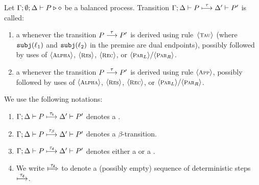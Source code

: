 \begin{definition}
\label{def:dettrans}
	Let  $\Gamma; \emptyset; \Delta \vdash P \triangleright \diamond$ be a balanced \HOp process. 
	Transition $\Gamma; \Delta \vdash P \stackrel{\tau}{\longmapsto} \Delta' \vdash P'$ is called:
%
	\begin{enumerate}[$-$]
		\item 
				a {\em \sesstran} whenever the   transition $P \stackrel{\tau}{\longrightarrow} P'$ 
				is derived using rule~${\langle \text{\footnotesize \textsc{Tau}} \rangle}$ 
				(where $\mathtt{subj}(\ell_1)$ and $\mathtt{subj}(\ell_2)$ in the premise are dual endpoints), 
				possibly followed by uses of  ${\langle \text{\footnotesize \textsc{Alpha}} \rangle}$, ${\langle \text{\footnotesize \textsc{Res}} \rangle}$, ${\langle \text{\footnotesize \textsc{Rec}} \rangle}$, or ${\langle \text{\footnotesize \textsc{Par${}_L$}} \rangle}/
				{\langle \text{\footnotesize \textsc{Par${}_R$}} \rangle}$.

		
		\item
				a {\em \betatran} whenever the transition $P \stackrel{\tau}{\longrightarrow} P'$
				is derived using rule ${\langle \text{\footnotesize \textsc{App}} \rangle}$,
				possibly followed by uses of  ${\langle \text{\footnotesize \textsc{Alpha}} \rangle}$, ${\langle \text{\footnotesize \textsc{Res}} \rangle}$, ${\langle \text{\footnotesize \textsc{Rec}} \rangle}$, or ${\langle \text{\footnotesize \textsc{Par${}_L$}} \rangle}/
				{\langle \text{\footnotesize \textsc{Par${}_R$}} \rangle}$.


	\end{enumerate}
%
\end{definition}

\begin{notation} We use the following notations:
	\begin{enumerate}[$-$]
		\item 	 $\Gamma; \Delta \vdash P \stackrel{\tau_{\mathsf{s}}}{\longmapsto} \Delta' \vdash P'$  denotes a \sesstran.
		
		\item  $\Gamma; \Delta \vdash P \stackrel{\tau_{\beta}}{\longmapsto} \Delta' \vdash P'$   denotes a $\beta$-transition.

		\item	 $\Gamma; \Delta \vdash P \stackrel{\tau_{\mathsf{d}}}{\longmapsto} \Delta' \vdash P'$   denotes
				either a \sesstran or a \betatran.
\item  We write $\Hby{\dtau}$ to denote a (possibly empty) sequence of deterministic steps $\stackrel{\tau_{\mathsf{d}}}{\longmapsto}$.
	\end{enumerate}
\end{notation}


